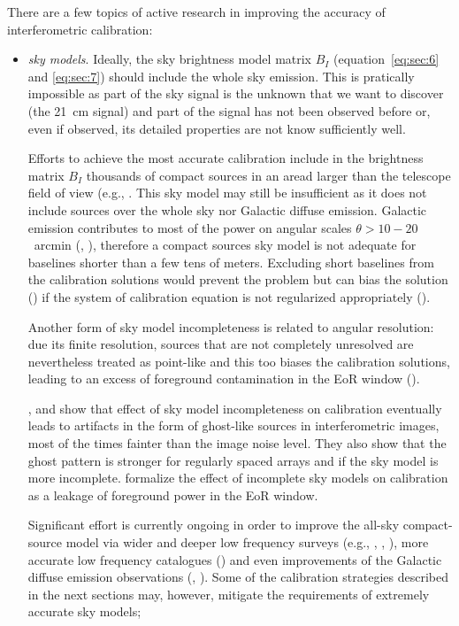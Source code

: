 There are a few topics of active research in improving the accuracy of interferometric calibration:
%
\begin{itemize}
\item {\it sky models}. Ideally, the sky brightness model matrix $B_I$ (equation~\ref{eq:sec:6} and \ref{eq:sec:7}) should include the whole sky emission. This is pratically impossible as part of the sky signal is the unknown that we want to discover (the 21~cm signal) and part of the signal has not been observed before or, even if observed, its detailed properties are not know sufficiently well. 

Efforts to achieve the most accurate calibration include in the brightness matrix $B_I$ thousands of compact sources in an aread larger than the telescope field of view (e.g., \cite{yatawatta13}. This sky model may still be insufficient as it does not include sources over the whole sky nor Galactic diffuse emission. Galactic emission contributes to most of the power on  angular scales $\theta > 10-20$~arcmin (\cite{bernardi09}, \cite{choudhuri17}), therefore a compact sources sky model is not adequate for baselines shorter than a few tens of meters. Excluding short baselines from the calibration solutions would prevent the problem but can bias the solution (\cite{patil16}) if the system of calibration equation is not regularized appropriately (\cite{sardabaradi19}).

Another form of sky model incompleteness is related to angular resolution: due its finite resolution, sources that are not completely unresolved are nevertheless treated as point-like and this too biases the calibration solutions, leading to an excess of foreground contamination in the EoR window (\cite{procopio17}). 

\cite{grobler14}, \cite{wijnholds16} and \cite{grobler16} show that effect of sky model incompleteness on calibration eventually leads to artifacts in the form of ghost-like sources in interferometric images, most of the times fainter than the image noise level. They also show that the ghost pattern is stronger for regularly spaced arrays and if the sky model is more incomplete. \cite{barry16} formalize the effect of incomplete sky models on calibration as a leakage of foreground power in the EoR window.

Significant effort is currently ongoing in order to improve the all-sky compact-source model via wider and deeper low frequency surveys (e.g., \cite{hurley-walker17}, \cite{intema17}, \cite{shimwell19}), more accurate low frequency catalogues (\cite{carroll16}) and even improvements of the Galactic diffuse emission observations (\cite{zheng17}, \cite{dowell17}). Some of the calibration strategies described in the next sections may, however, mitigate the requirements of extremely accurate sky models;


\end{itemize}
